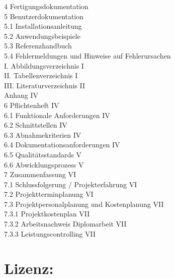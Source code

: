 \documentclass[12pt,a4paper]{article}
\begin{document}
{{{	4 Fertigungsdokumentation 			\\
	5 Benutzerdokumentation 			\\
	\phantom{11}5.1 Installationsanleitung 			\\
	\phantom{11}5.2 Anwendungsbeispiele 			\\
	\phantom{11}5.3 Referenzhandbuch 				\\
	\phantom{11}5.4 Fehlermeldungen und Hinweise auf Fehlerursachen 		\\
\clearpage\vfill\newpage{}\noindent%
	I. Abbildungsverzeichnis \dotfill I		\\
	II. Tabellenverzeichnis \dotfill I		\\
	III. Literaturverzeichnis \dotfill II		\\
	Anhang \dotfill IV				\\
	6 Pflichtenheft \dotfill IV			\\
	\phantom{11}6.1 Funktionale Anforderungen \dotfill IV	\\
	\phantom{11}6.2 Schnittstellen \dotfill IV			\\
	\phantom{11}6.3 Abnahmekriterien \dotfill IV		\\
	\phantom{11}6.4 Dokumentationsanforderungen \dotfill IV	\\
	\phantom{11}6.5 Qualitätsstandards \dotfill V		\\
	\phantom{11}6.6 Abwicklungsprozess \dotfill V		\\
	7 Zusammenfassung \dotfill VI			\\
	\phantom{11}7.1 Schlussfolgerung / Projekterfahrung \dotfill VI	\\
	\phantom{11}7.2 Projektterminplanung \dotfill VI		\\
	\phantom{11}7.3 Projektpersonalplanung und Kostenplanung \dotfill VII	\\
	\phantom{111}7.3.1 Projektkostenplan \dotfill VII		\\
	\phantom{111}7.3.2 Arbeitsnachweis Diplomarbeit \dotfill VII	\\
	\phantom{111}7.3.3 Leistungscontrolling \dotfill VII		\\
}
}	%



\clearpage\vfill\newpage{}

\section{Lizenz:}

}
\end{document}

